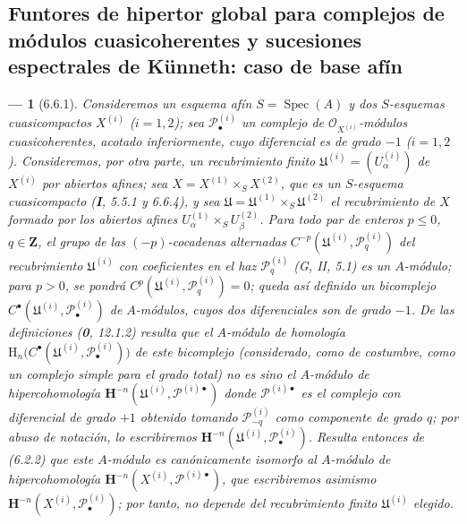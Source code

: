 \documentclass[10pt,oneside,openany]{book}
\theoremstyle{egaenv}\newtheorem*{env}{---}
\theoremstyle{egastatement}
\theoremstyle{egadescription}
\begin{document}
\subsection{Funtores de hipertor global para complejos de módulos
cuasicoherentes y sucesiones espectrales de Künneth: caso de base afín}
\label{subsection:III.6.6}
\label{subsection:III.6.6.fr}

\begin{env}[6.6.1]
\label{III.6.6.1}
Consideremos un esquema afín $S=\operatorname{Spec}(A)$ y dos $S$-\emph{esquemas}
cuasicompactos $X^{(i)}$ ($i=1,2$); sea $\mathscr P_\bullet^{(i)}$ un complejo
de $\mathscr O_{X^{(i)}}$-módulos cuasicoherentes, \emph{acotado inferiormente},
cuyo diferencial es de grado $-1$ ($i=1,2$). Consideremos, por otra parte, un
recubrimiento \emph{finito}
$\mathfrak U^{(i)}=(U_\alpha^{(i)})$ de $X^{(i)}$ por abiertos afines; sea
$X=X^{(1)}\times_S X^{(2)}$,
que es un $S$-esquema cuasicompacto (\textbf I, 5.5.1 y 6.6.4), y sea
$\mathfrak U=\mathfrak U^{(1)}\times_S\mathfrak U^{(2)}$ el recubrimiento de
$X$ formado por los abiertos afines
$U_\alpha^{(1)}\times_S U_\beta^{(2)}$. Para todo par de enteros
$p\leqslant0$, $q\in\mathbf Z$, el grupo de las $(-p)$-cocadenas alternadas
$C^{-p}(\mathfrak U^{(i)},\mathscr P_q^{(i)})$
del recubrimiento $\mathfrak U^{(i)}$ con coeficientes en el haz
$\mathscr P_q^{(i)}$ (G, II, 5.1) es un $A$-módulo; para $p>0$, se pondrá
$C^p(\mathfrak U^{(i)},\mathscr P_q^{(i)})=0$; queda así definido un
\emph{bicomplejo}
$C^\bullet(\mathfrak U^{(i)},\mathscr P_\bullet^{(i)})$
de $A$-módulos, cuyos \emph{dos} diferenciales son de grado $-1$. De las
definiciones (\textbf{0}, 12.1.2) resulta que el $A$-módulo de homología
$\mathrm H_n\bigl(C^\bullet
(\mathfrak U^{(i)},\mathscr P_\bullet^{(i)})\bigr)$
de este bicomplejo (considerado, como de costumbre, como un complejo simple
para el grado total) no es sino el $A$-módulo de \emph{hipercohomología}
$\mathbf H^{-n}
(\mathfrak U^{(i)},\mathscr P^{(i)\bullet})$
donde $\mathscr P^{(i)\bullet}$ es el complejo con diferencial de grado $+1$
obtenido tomando $\mathscr P_{-q}^{(i)}$ como componente de grado $q$; por
abuso de notación, lo escribiremos
$\mathbf H^{-n}(\mathfrak U^{(i)},\mathscr P_\bullet^{(i)})$. Resulta entonces
de (6.2.2) que este $A$-módulo es canónicamente isomorfo al $A$-módulo de
hipercohomología
$\mathbf H^{-n}(X^{(i)},\mathscr P^{(i)\bullet})$, que escribiremos asimismo
$\mathbf H^{-n}(X^{(i)},\mathscr P_\bullet^{(i)})$; por tanto, no depende del
recubrimiento finito $\mathfrak U^{(i)}$ elegido.
\end{env}
\end{document}
